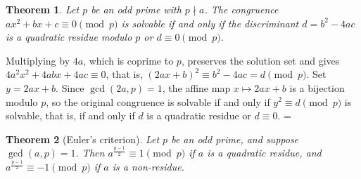\documentclass[11pt]{article}
\makeatletter
\let\nt@closedisplay\]
\def\nt@guardedclose{\@ifnextchar\par{\nt@closeafterpar}{\@ifnextchar\end{\postdisplaypenalty\@M\nt@closedisplay}{\nt@closedisplay}}}
\def\nt@closeafterpar\par{\@ifnextchar\par{\nt@closeafterpar}{\@ifnextchar\end{\postdisplaypenalty\@M\nt@closedisplay\par}{\nt@closedisplay\par}}}
\renewenvironment{proof}[1][\proofname]{\par
  \pushQED{\qed}\normalfont\topsep\medskipamount\edef\nt@afterproof{\@endparpenalty=\the\@endparpenalty\relax}\@beginparpenalty\@M\@endparpenalty\@M\let\]\nt@guardedclose\trivlist\item[]\textit{#1\@addpunct{.}} \ignorespaces}{\ifvmode\addpenalty\@M\fi\popQED\nt@afterproof\endtrivlist\@endpefalse}
\theoremstyle{ntstyle}
\newtheorem{theorem}{Theorem}[subsection]
\makeatother
\begin{document}
\begin{theorem}\label{thm:7.1.1} Let $p$ be an odd prime with $p \nmid a$. The congruence
  $ax^{2} + bx + c \equiv 0 \pmod{p}$ is solvable if and only if the
  discriminant $d = b^{2} - 4ac$ is a quadratic residue modulo $p$ or
  $d \equiv 0 \pmod{p}$.

\end{theorem}

\begin{proof} Multiplying by $4a$, which is coprime to $p$,
  preserves the solution set and gives $4a^{2}x^{2} + 4abx + 4ac \equiv 0$, that is,
  $(2ax + b)^{2} \equiv b^{2} - 4ac = d \pmod{p}$. Set $y = 2ax + b$. Since $\gcd(2a, p) = 1$, the affine map
  $x \mapsto 2ax + b$
  is a bijection modulo $p$, so the original congruence is solvable if
  and only if $y^{2} \equiv d \pmod{p}$ is solvable, that is, if and only if
  $d$ is a quadratic residue or $d \equiv 0$.
\end{proof}

\begin{theorem}[Euler's criterion]\label{thm:7.1.2}\label{thm:euler-criterion}
  Let $p$ be an
  odd prime, and suppose $\gcd(a, p) = 1$. Then $a^{\frac{p-1}{2}} \equiv 1 \pmod{p}$ if $a$ is a quadratic
  residue, and $a^{\frac{p-1}{2}} \equiv -1 \pmod{p}$ if
  $a$ is a non-residue.

\end{theorem}
\end{document}
